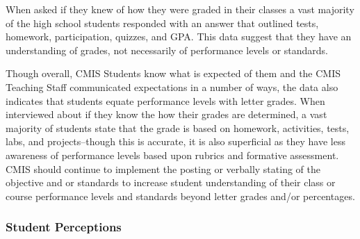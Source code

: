 \begin{findings}

When asked if they knew of how they were graded in their classes a vast majority of the high school students responded with an answer that outlined tests, homework, participation, quizzes, and GPA. This data suggest that they have an understanding of grades, not necessarily of performance levels or standards. 


Though overall, CMIS Students know what is expected of them and the CMIS Teaching Staff communicated expectations in a number of ways, the data also indicates that students equate performance levels with letter grades. When interviewed about if they know the how their grades are determined, a vast majority of students state that the grade is based on homework, activities, tests, labs, and projects--though this is accurate, it is also superficial as they have less awareness of performance levels based upon rubrics and formative assessment. CMIS should continue to implement the posting or verbally stating of the objective and or standards to increase student understanding of their class or course performance levels and standards beyond letter grades and/or percentages. 
\end{findings}

\subsubsection{Student Perceptions }



